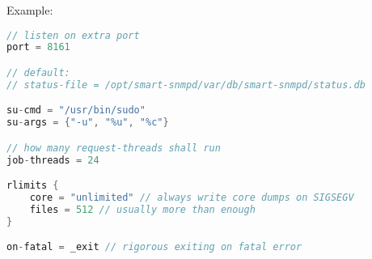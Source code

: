 \begin{minipage}{\textwidth}
Example:
\begin{lstlisting}[language=C++,inputencoding=latin9,frame=shadowbox]
// listen on extra port
port = 8161

// default:
// status-file = /opt/smart-snmpd/var/db/smart-snmpd/status.db

su-cmd = "/usr/bin/sudo"
su-args = {"-u", "%u", "%c"}

// how many request-threads shall run
job-threads = 24

rlimits {
    core = "unlimited" // always write core dumps on SIGSEGV
    files = 512 // usually more than enough
}

on-fatal = _exit // rigorous exiting on fatal error
\end{lstlisting}
\end{minipage}

